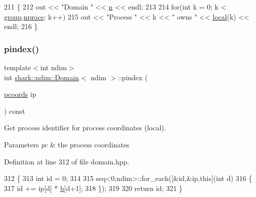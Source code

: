 \begin{DoxyCode}
211                                                         \{
212     out << \textcolor{stringliteral}{"Domain "} << \hyperlink{classshark_1_1ndim_1_1_domain_ab942ffcf99c5ee0f2589c8b9104abcfd}{n} << endl;
213 
214     \textcolor{keywordflow}{for}(\textcolor{keywordtype}{int} k = 0; k < \hyperlink{classshark_1_1ndim_1_1_domain_a2bbf100371762ce405efd218bc1e3d0f}{group}.\hyperlink{classshark_1_1_group_a90e041a7fa6c40c924b17f8c2006e6b2}{nprocs}; k++)
215         out << \textcolor{stringliteral}{"Process "} << k << \textcolor{stringliteral}{" owns "} << \hyperlink{classshark_1_1ndim_1_1_domain_a3351db56f9d6bd22ba473d744e3f7025}{local}(k) << endl;
216 \}
\end{DoxyCode}
\hypertarget{classshark_1_1ndim_1_1_domain_ad22dcae5c29d3d20dc279930b9423853}{}\label{classshark_1_1ndim_1_1_domain_ad22dcae5c29d3d20dc279930b9423853} 
\subsubsection{\texorpdfstring{pindex()}{pindex()}}
{\footnotesize\ttfamily template$<$int ndim$>$ \\
int \hyperlink{classshark_1_1ndim_1_1_domain}{shark\+::ndim\+::\+Domain}$<$ ndim $>$\+::pindex (\begin{DoxyParamCaption}\item[{\hyperlink{classshark_1_1ndim_1_1_domain_a9684ccd8af33cff7639c782290ac37ee}{pcoords}}]{ip }\end{DoxyParamCaption}) const\hspace{0.3cm}{\ttfamily [inline]}}

Get process identifier for process coordinates (local). 
\begin{DoxyParams}{Parameters}
{\em pc} & the process coordinates \\
\hline
\end{DoxyParams}


Definition at line 312 of file domain.\+hpp.


\begin{DoxyCode}
312                                                         \{
313             \textcolor{keywordtype}{int} \textcolor{keywordtype}{id} = 0;
314 
315             seq<0,ndim>::for\_each([&\textcolor{keywordtype}{id},&ip,\textcolor{keyword}{this}](\textcolor{keywordtype}{int} d)
316             \{
317                 \textcolor{keywordtype}{id} += ip[d] * \hyperlink{classshark_1_1ndim_1_1_domain_a3b9ed7ea09cc2d90575a43f92cc4e105}{b}[d+1];
318             \});
319 
320             \textcolor{keywordflow}{return} id;
321         \}
\end{DoxyCode}
\hypertarget{classshark_1_1ndim_1_1_domain_ae6830337d8bdd203b5267ce7666362b0}{}\label{classshark_1_1ndim_1_1_domain_ae6830337d8bdd203b5267ce7666362b0} 
